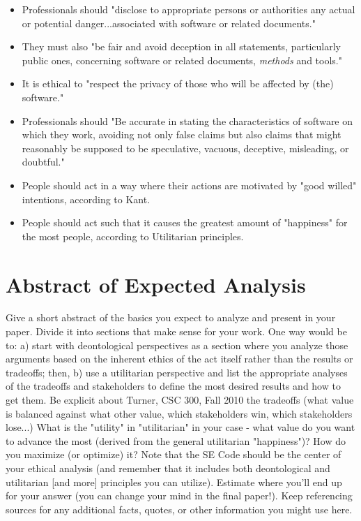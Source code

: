 \documentclass[12pt]{article}
\begin{document}
\begin{itemize}
\item Professionals should "disclose to appropriate persons or authorities any actual or potential danger...associated with software or related documents." \cite{secode}
\item They must also "be fair and avoid deception in all statements, particularly public ones, concerning software or related documents, \emph{methods} and tools." \cite{secode}
\item It is ethical to "respect the privacy of those who will be affected by (the) software." \cite{secode}
\item Professionals should "Be accurate in stating the characteristics of software on which they work, avoiding not only false claims but also claims that might reasonably be supposed to be speculative, vacuous, deceptive, misleading, or doubtful." \cite{secode}
\item People should act in a way where their actions are motivated by "good willed" intentions, according to Kant. \cite{kant}
\item People should act such that it causes the greatest amount of "happiness" for the most people, according to Utilitarian principles. \cite{util}
\end{itemize}

\section{Abstract of Expected Analysis}
Give a short abstract of the basics you expect to analyze and present in your paper. Divide it into sections that make sense for your work.
One way would be to: a) start with deontological perspectives as a section where you analyze those arguments based on the inherent ethics of the act itself rather than the results or tradeoffs; then, b) use a utilitarian perspective and list the appropriate analyses of the tradeoffs and stakeholders to define the most desired results and how to get them. Be explicit about
Turner, CSC 300, Fall 2010
the tradeoffs (what value is balanced against what other value, which stakeholders win, which stakeholders lose...) What is the "utility" in "utilitarian" in your case - what value do you want to advance the most (derived from the general utilitarian "happiness")? How do you maximize (or optimize) it?
Note that the SE Code should be the center of your ethical analysis (and remember that it includes both deontological and utilitarian [and more] principles you can utilize). Estimate where you'll end up for your answer (you can change your mind in the final paper!). Keep referencing sources for any additional facts, quotes, or other information you might use here. \cite{handout}
\end{document}
